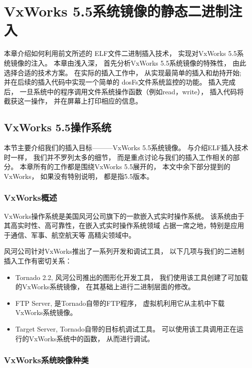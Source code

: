\chapter{VxWorks 5.5系统镜像的静态二进制注入}

本章介绍如何利用前文所述的
ELF文件二进制插入技术，
实现对VxWorks 5.5系统镜像的注入。
本章由浅入深，
首先分析VxWorks 5.5系统镜像的特殊性，
由此选择合适的技术方案。
在实际的插入工作中，
从实现最简单的插入和劫持开始;
并在后续的插入代码中实现一个简单的
dosFs文件系统监控的功能。
插入完成后，
一旦系统中的程序调用文件系统操作函数（例如read，write），
插入代码将截获这一操作，
并在屏幕上打印相应的信息。


\section{VxWorks 5.5操作系统}

本节主要介绍我们的插入目标———VxWorks 5.5系统镜像。
与介绍ELF插入技术时一样，
我们并不罗列太多的细节，
而是重点讨论与我们的插入工作相关的部分。
本章所有的工作都是围绕VxWorks 5.5展开的，
本文中余下部分提到的VxWorks，
如果没有特别说明，
都是指5.5版本。


\subsection{VxWorks概述}

VxWorks操作系统是美国风河公司旗下的一款嵌入式实时操作系统。
该系统由于其高实时性、高可靠性，在嵌入式实时操作系统领域
占据一席之地，特别是应用于通信、军事、航空航天等
高精尖领域中。

风河公司针对VxWorks推出了一系列开发和调试工具，
以下几项与我们的二进制插入工作有密切关系：

\begin{itemize}
 \item Tornado 2.2, 风河公司推出的图形化开发工具，
我们使用该工具创建了可加载的VxWorks系统镜像，
在其基础上进行二进制层面的修改。
 \item FTP Server, 是Tornado自带的FTP程序，
虚拟机利用它从主机中下载VxWorks系统镜像。
 \item Target Server, Tornado自带的目标机调试工具。
可以使用该工具调用正在运行的VxWorks系统中的函数，
从而进行调试。
\end{itemize}


\subsection{VxWorks系统映像种类}

